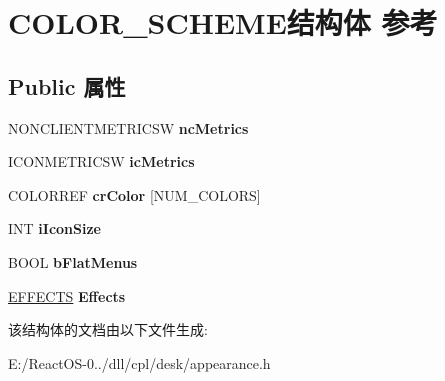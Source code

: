 \hypertarget{struct_c_o_l_o_r___s_c_h_e_m_e}{}\section{C\+O\+L\+O\+R\+\_\+\+S\+C\+H\+E\+M\+E结构体 参考}
\label{struct_c_o_l_o_r___s_c_h_e_m_e}
\subsection*{Public 属性}
\begin{DoxyCompactItemize}
\item 
\mbox{\label{struct_c_o_l_o_r___s_c_h_e_m_e_a6b34bc81e5ab98a5ad5cd39d2a499976}} 
N\+O\+N\+C\+L\+I\+E\+N\+T\+M\+E\+T\+R\+I\+C\+SW {\bfseries nc\+Metrics}
\item 
\mbox{\label{struct_c_o_l_o_r___s_c_h_e_m_e_a5798603d044065e47ec34adcebbfddbc}} 
I\+C\+O\+N\+M\+E\+T\+R\+I\+C\+SW {\bfseries ic\+Metrics}
\item 
\mbox{\label{struct_c_o_l_o_r___s_c_h_e_m_e_a634b3056a30fc0857680f6d6f3c25877}} 
C\+O\+L\+O\+R\+R\+EF {\bfseries cr\+Color} \mbox{[}N\+U\+M\+\_\+\+C\+O\+L\+O\+RS\mbox{]}
\item 
\mbox{\label{struct_c_o_l_o_r___s_c_h_e_m_e_a29ad0c846427616528407b1d8dc18709}} 
I\+NT {\bfseries i\+Icon\+Size}
\item 
\mbox{\label{struct_c_o_l_o_r___s_c_h_e_m_e_a0c1d1668c87bdcbea65b7b2bedc99d20}} 
B\+O\+OL {\bfseries b\+Flat\+Menus}
\item 
\mbox{\label{struct_c_o_l_o_r___s_c_h_e_m_e_abb2ffcb4e5a77201598dde5bc860d789}} 
\hyperlink{struct_e_f_f_e_c_t_s}{E\+F\+F\+E\+C\+TS} {\bfseries Effects}
\end{DoxyCompactItemize}


该结构体的文档由以下文件生成\+:\begin{DoxyCompactItemize}
\item 
E\+:/\+React\+O\+S-\/0../dll/cpl/desk/appearance.\+h\end{DoxyCompactItemize}
